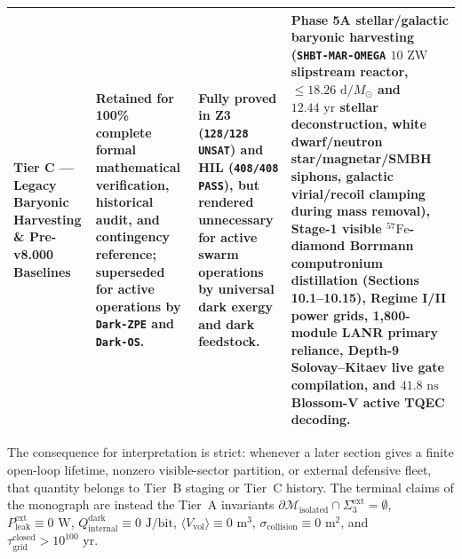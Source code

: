 \documentclass[11pt,onecolumn]{article}
\begin{document}
\begin{table}[!htbp]
{\begin{tabularx}{\linewidth}{@{}p{2.6cm} p{4.2cm} X p{4.6cm}@{}}
\textbf{Tier C --- Legacy Baryonic Harvesting \& Pre-v8.000 Baselines} & Retained for 100\% complete formal mathematical verification, historical audit, and contingency reference; superseded for active operations by \texttt{Dark-ZPE} and \texttt{Dark-OS}. & Fully proved in Z3 (\texttt{128/128 UNSAT}) and HIL (\texttt{408/408 PASS}), but rendered unnecessary for active swarm operations by universal dark exergy and dark feedstock. & Phase 5A stellar/galactic baryonic harvesting (\texttt{SHBT-MAR-OMEGA} $10\text{ ZW}$ slipstream reactor, $\le18.26\text{ d}/M_\odot$ and $12.44\text{ yr}$ stellar deconstruction, white dwarf/neutron star/magnetar/SMBH siphons, galactic virial/recoil clamping during mass removal), Stage-1 visible $^{57}\text{Fe}$-diamond Borrmann computronium distillation (Sections 10.1--10.15), Regime I/II power grids, 1,800-module LANR primary reliance, Depth-9 Solovay--Kitaev live gate compilation, and $41.8\text{ ns}$ Blossom-V active TQEC decoding. \\
\bottomrule
\end{tabularx}}
\end{table}

The consequence for interpretation is strict: whenever a later section gives a finite open-loop lifetime, nonzero visible-sector partition, or external defensive fleet, that quantity belongs to Tier~B staging or Tier~C history. The terminal claims of the monograph are instead the Tier~A invariants $\partial\mathcal M_{\text{isolated}}\cap\Sigma_3^{\text{ext}}=\emptyset$, $P_{\text{leak}}^{\text{ext}}\equiv0\text{ W}$, $Q_{\text{internal}}^{\text{dark}}\equiv0\text{ J/bit}$, $\langle V_{\text{vol}}\rangle\equiv0\text{ m}^3$, $\sigma_{\text{collision}}\equiv0\text{ m}^2$, and $\tau_{\text{grid}}^{\text{closed}}>10^{100}\text{ yr}$.
\end{document}
